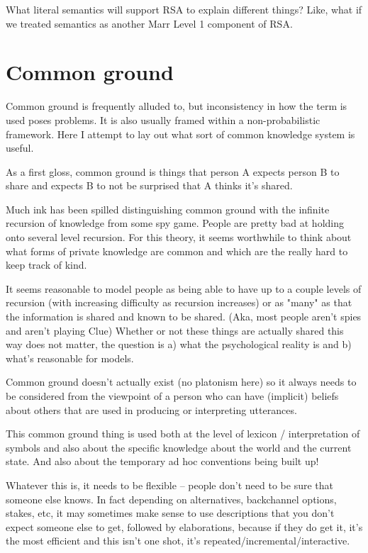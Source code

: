 \documentclass[]{article}
\begin{document}
What literal semantics will support RSA to explain different things? Like, what if we treated semantics as another Marr Level 1 component of RSA. 

\section{Common ground}
Common ground is frequently alluded to, but inconsistency in how the term is used poses problems. It is also usually framed within a non-probabilistic framework. Here I attempt to lay out what sort of common knowledge system is useful. 

As a first gloss, common ground is things that person A expects person B to share and expects B to not be surprised that A thinks it's shared. 

Much ink has been spilled distinguishing common ground with the infinite recursion of knowledge from some spy game. People are pretty bad at holding onto several level recursion. For this theory, it seems worthwhile to think about what forms of private knowledge are common and which are the really hard to keep track of kind. 

It seems reasonable to model people as being able to have up to a couple levels of recursion (with increasing difficulty as recursion increases) or as "many" as that the information is shared and known to be shared. (Aka, most people aren't spies and aren't playing Clue) Whether or not these things are actually shared this way does not matter, the question is a) what the psychological reality is and b) what's reasonable for models. 

Common ground doesn't actually exist (no platonism here) so it always needs to be considered from the viewpoint of a person who can have (implicit) beliefs about others that are used in producing or interpreting utterances. 

This common ground thing is used both at the level of lexicon / interpretation of symbols and also about the specific knowledge about the world and the current state. And also about the temporary ad hoc conventions being built up! 

Whatever this is, it needs to be flexible -- people don't need to be sure that someone else knows. In fact depending on alternatives, backchannel options, stakes, etc, it may sometimes make sense to use descriptions that you don't expect someone else to get, followed by elaborations, because if they do get it, it's the most efficient and this isn't one shot, it's repeated/incremental/interactive. 
\end{document}
